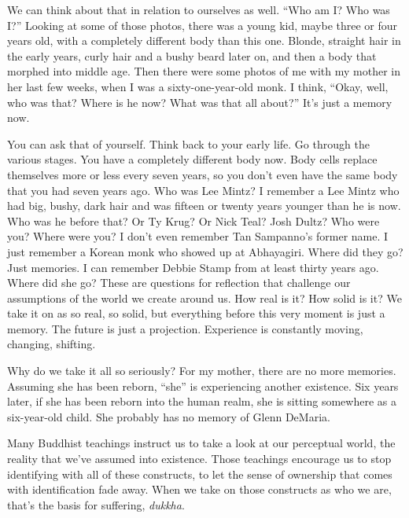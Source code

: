 We can think about that in relation to ourselves as well. ``Who am I? Who was I?'' Looking at some of those photos, there was a young kid, maybe three or four years old, with a completely different body than this one. Blonde, straight hair in the early years, curly hair and a bushy beard later on, and then a body that morphed into middle age. Then there were some photos of me with my mother in her last few weeks, when I was a sixty-one-year-old monk. I think, ``Okay, well, who was that? Where is he now? What was that all about?'' It's just a memory now.

You can ask that of yourself. Think back to your early life. Go through the various stages. You have a completely different body now. Body cells replace themselves more or less every seven years, so you don't even have the same body that you had seven years ago. Who was Lee Mintz? I remember a Lee Mintz who had big, bushy, dark hair and was fifteen or twenty years younger than he is now. Who was he before that? Or Ty Krug? Or Nick Teal? Josh Dultz? Who were you? Where were you? I don't even remember Tan Sampanno's former name. I just remember a Korean monk who showed up at Abhayagiri. Where did they go? Just memories. I can remember Debbie Stamp from at least thirty years ago. Where did she go? These are questions for reflection that challenge our assumptions of the world we create around us. How real is it? How solid is it? We take it on as so real, so solid, but everything before this very moment is just a memory. The future is just a projection. Experience is constantly moving, changing, shifting.

Why do we take it all so seriously? For my mother, there are no more memories. Assuming she has been reborn, ``she'' is experiencing another existence. Six years later, if she has been reborn into the human realm, she is sitting somewhere as a six-year-old child. She probably has no memory of Glenn DeMaria.

Many Buddhist teachings instruct us to take a look at our perceptual world, the reality that we've assumed into existence. Those teachings encourage us to stop identifying with all of these constructs, to let the sense of ownership that comes with identification fade away. When we take on those constructs as who we are, that's the basis for suffering, \emph{dukkha}.

